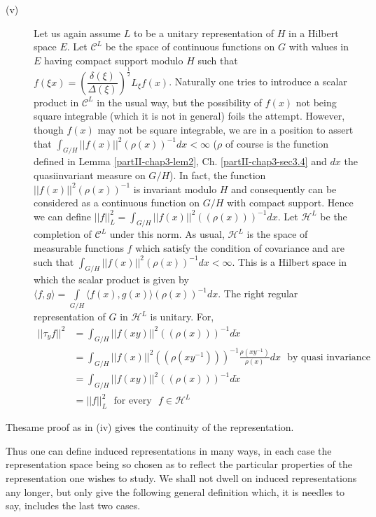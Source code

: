 \begin{description}
\item[(v)] Let us again assume $L$ to be a unitary representation of
  $H$ in a Hilbert space $E$. Let $\mathscr{C}^L$ be the space of
  continuous functions on $G$ with values in $E$ having compact
  support modulo $H$ such that $f(\xi x) =
  \left(\dfrac{\delta(\xi)}{\Delta(\xi)}\right)^{\frac{1}{2}}
  L_\xi f(x)$. Naturally one tries to introduce a scalar product in
  $\mathscr{C}^L$ in the usual way, but the possibility of $f(x)$ not
  being square integrable (which 
it is not in general) foils the attempt. However, though $f(x)$ may
not be square integrable, we are in a position to assert that
$\int_{G/H}||f(x)||^2(\rho(x))^{-1} dx<\infty$ ($\rho$ of course
is the  function defined in Lemma \ref{partII-chap3-lem2},
Ch. \ref{partII-chap3-sec3.4} and $dx$ the quasiinvariant 
measure on $G/H$). In fact, the function $||f(x)||^2(\rho(x))^{-1}$
is invariant modulo $H$ and consequently can be considered as a
continuous function on $G/H$ with compact support. Hence we can define
$||f||^2_L = \int_{G/H}||f(x)||^2\left((\rho(x))\right)^{-1}
dx$. Let $\mathscr{H}^L$ be the completion of $\mathscr{C}^L$ under
this norm. As usual, $\mathscr{H}^L$ is the space of measurable
functions $f$ which satisfy the condition of covariance and are such
that $\int_{G/H}||f(x)||^{2}(\rho(x))^{-1}dx<\infty$.
This 
is a Hilbert space in which the scalar product is given by $\langle
f,g \rangle  = \int\limits_{G/H} \langle f(x), g(x) \rangle (\rho
(x))^{-1}  dx$. The right regular representation of $G$ in
$\mathscr{H}^L$ is unitary. For,  
\begin{align*}
||\tau_yf||^2 & = \int_{G/H}||f(xy)||^2
\left((\rho(x))\right)^{-1}d\dot{x}\\ 
& =\int_{G/H}||f(x)||^2
\left((\rho(xy^{-1}))\right)^{-1}\frac{\rho(xy^{-1})}{\rho(x)}dx
     \text{~ by quasi invariance}\\ 
& =\int_{G/H}||f(xy)||^2 \left ( (\rho(x))\right )^{-1}d\dot{x}\\ 
& =||f||^2_L \text{~ for every~ }f\in\mathscr{H}^L
\end{align*}
\end{description}

The\pageoriginale same proof as in (iv) gives the continuity of the
representation. 

Thus one can define induced representations in many ways, in each case
the representation space being so chosen as to reflect the particular
properties of the representation one wishes to study. We shall not
dwell on induced representations any longer, but only give the
following general definition which, it is needles to say, includes the
last two cases. 

